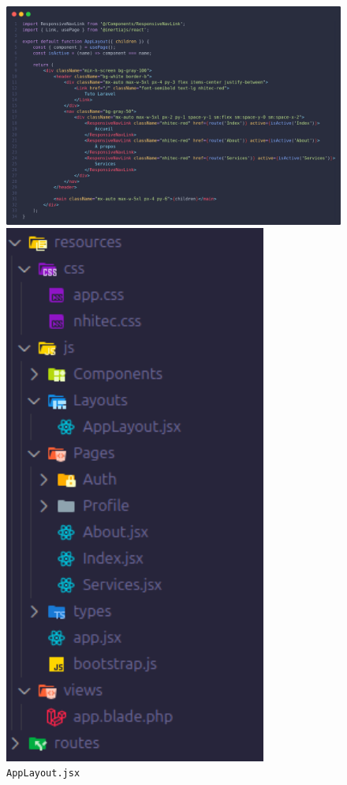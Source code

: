 \begin{figure}[!h]
    \centering
    \begin{minipage}{0.7\textwidth}
         \centering
         \includegraphics[width=.9\textwidth]{figures-C1/AppLayout.jsx.png}
         \caption{\texttt{AppLayout.jsx}\label{fig:navbar}}
    \end{minipage}
    \begin{minipage}{0.28\textwidth}
        \vspace{1cm}
         \centering
         \includegraphics[width=0.77\textwidth]{figures-C1/repo_directory.png}

\end{minipage}
\end{figure}

